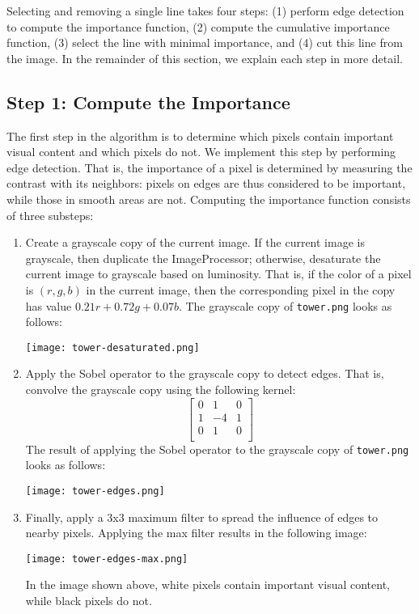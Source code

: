 \documentclass{article}
\newcommand{\co}[1]{#1}
\begin{document}
Selecting and removing a single line takes four steps: (1) perform edge detection to compute the importance function, (2) compute the cumulative importance function, (3) select the line with minimal importance, and (4) cut this line from the image. In the remainder of this section, we explain each step in more detail.

\subsection*{Step 1: Compute the Importance}
The first step in the algorithm is to determine which pixels contain important visual content and which pixels do not. We implement this step by performing edge detection. That is, the importance of a pixel is determined by measuring the contrast with its neighbors: pixels on edges are thus considered to be important, while those in smooth areas are not. Computing the importance function consists of three substeps:
\begin{enumerate}
   \item Create a grayscale copy of the current image. If the current image is grayscale, then duplicate the \co{ImageProcessor}; otherwise, desaturate the current image to grayscale based on luminosity. That is, if the color of a pixel is $(r, g, b)$ in the current image, then the corresponding pixel in the copy has value $0.21r + 0.72g + 0.07b$. The grayscale copy of \texttt{tower.png} looks as follows:
\begin{center}
\texttt{[image: tower-desaturated.png]}
\end{center}
   \item Apply the Sobel operator to the grayscale copy to detect edges. That is, convolve the grayscale copy using the following kernel:
$$\begin{bmatrix}
0 & 1 & 0\\
1 & -4 & 1\\
0 & 1 & 0\\   
\end{bmatrix}$$
The result of applying the Sobel operator to the grayscale copy of \texttt{tower.png} looks as follows:
\begin{center}
\texttt{[image: tower-edges.png]}
\end{center}
  \item Finally, apply a 3x3 maximum filter to spread the influence of edges to nearby pixels. Applying the max filter results in the following image:
\begin{center}
\texttt{[image: tower-edges-max.png]}
\end{center}
In the image shown above, white pixels contain important visual content, while black pixels do not.
\end{enumerate}
\end{document}
